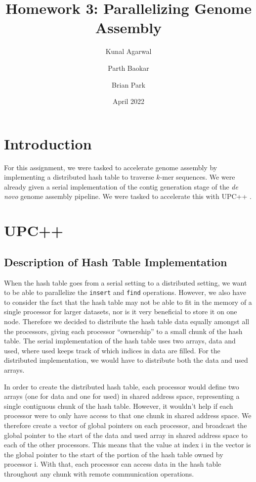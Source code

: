\documentclass{article}
\title{Homework 3: Parallelizing Genome Assembly}
\author{Kunal Agarwal}
\author{Parth Baokar}
\author{Brian Park}
\affil{UC Berkeley, Computer Science 267}
\date{April 2022}
\begin{document}
\maketitle

\section{Introduction}
For this assignment, we were tasked to accelerate genome assembly by implementing a distributed hash table to traverse $k$-mer sequences. We were already given a serial implementation of the contig generation stage of the \textit{de novo} genome assembly pipeline. We were tasked to accelerate this with UPC++ \cite{upc++}.

\section{UPC++}
\subsection{Description of Hash Table Implementation}

When the hash table goes from a serial setting to a distributed setting, we want to be able to parallelize the \verb|insert| and \verb|find| operations. However, we also have to consider the fact that the hash table may not be able to fit in the memory of a single processor for larger datasets, nor is it very beneficial to store it on one node. Therefore we decided to distribute the hash table data equally amongst all the processors, giving each processor “ownership” to a small chunk of the hash table. The serial implementation of the hash table uses two arrays, data and used, where used keeps track of which indices in data are filled. For the distributed implementation, we would have to distribute both the data and used arrays.

In order to create the distributed hash table, each processor would define two arrays (one for data and one for used) in shared address space, representing a single contiguous chunk of the hash table. However, it wouldn’t help if each processor were to only have access to that one chunk in shared address space. We therefore create a vector of global pointers on each processor, and broadcast the global pointer to the start of the data and used array in shared address space to each of the other processors. This means that the value at index i in the vector is the global pointer to the start of the portion of the hash table owned by processor i. With that, each processor can access data in the hash table throughout any chunk with remote communication operations.
\end{document}
